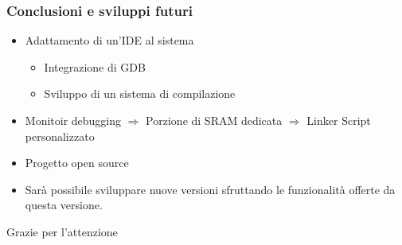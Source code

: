 \documentclass[aspectratio=169,
]{beamer}
\begin{document}
    \begin{frame}
        \frametitle{Conclusioni e sviluppi futuri}
    
        \begin{itemize}
            \item <1-> Adattamento di un'IDE al sistema
            \begin{itemize}
                \item <2-> Integrazione di GDB
                \item <3-> Sviluppo di un sistema di compilazione
            \end{itemize}
            \item <4-> Monitoir debugging \(\Rightarrow\) Porzione di SRAM dedicata \(\Rightarrow\) Linker Script personalizzato
            \item <5-> Progetto open source
            \item <6-> Sarà possibile sviluppare nuove versioni sfruttando le funzionalità offerte da questa versione.
        \end{itemize}
    

    \end{frame}

    \appendix
    \begin{frame}
        Grazie per l'attenzione
    \end{frame}
    
\end{document}
